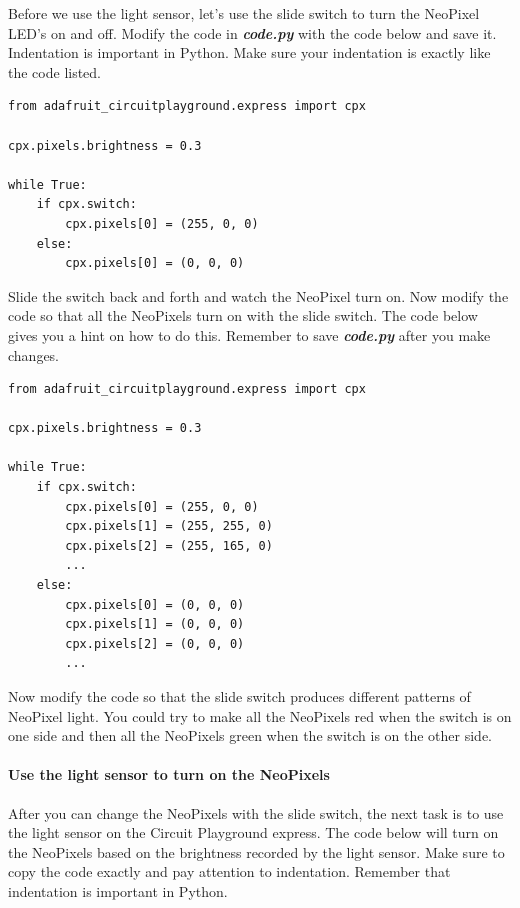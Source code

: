 \documentclass[11pt]{article}
\begin{document}
Before we use the light sensor, let's use the slide switch to turn the
NeoPixel LED's on and off. Modify the code in \textbf{\emph{code.py}}
with the code below and save it. Indentation is important in Python.
Make sure your indentation is exactly like the code listed.

\begin{verbatim}
from adafruit_circuitplayground.express import cpx

cpx.pixels.brightness = 0.3

while True:
    if cpx.switch:
        cpx.pixels[0] = (255, 0, 0)
    else:
        cpx.pixels[0] = (0, 0, 0)
\end{verbatim}

Slide the switch back and forth and watch the NeoPixel turn on. Now
modify the code so that all the NeoPixels turn on with the slide switch.
The code below gives you a hint on how to do this. Remember to save
\textbf{\emph{code.py}} after you make changes.

\begin{verbatim}
from adafruit_circuitplayground.express import cpx

cpx.pixels.brightness = 0.3

while True:
    if cpx.switch:
        cpx.pixels[0] = (255, 0, 0)
        cpx.pixels[1] = (255, 255, 0)
        cpx.pixels[2] = (255, 165, 0)
        ...
    else:
        cpx.pixels[0] = (0, 0, 0)
        cpx.pixels[1] = (0, 0, 0)
        cpx.pixels[2] = (0, 0, 0)
        ...
\end{verbatim}

Now modify the code so that the slide switch produces different patterns
of NeoPixel light. You could try to make all the NeoPixels red when the
switch is on one side and then all the NeoPixels green when the switch
is on the other side.

\hypertarget{use-the-light-sensor-to-turn-on-the-neopixels}{%
\paragraph{Use the light sensor to turn on the
NeoPixels}\label{use-the-light-sensor-to-turn-on-the-neopixels}}

After you can change the NeoPixels with the slide switch, the next task
is to use the light sensor on the Circuit Playground express. The code
below will turn on the NeoPixels based on the brightness recorded by the
light sensor. Make sure to copy the code exactly and pay attention to
indentation. Remember that indentation is important in Python.
\end{document}
